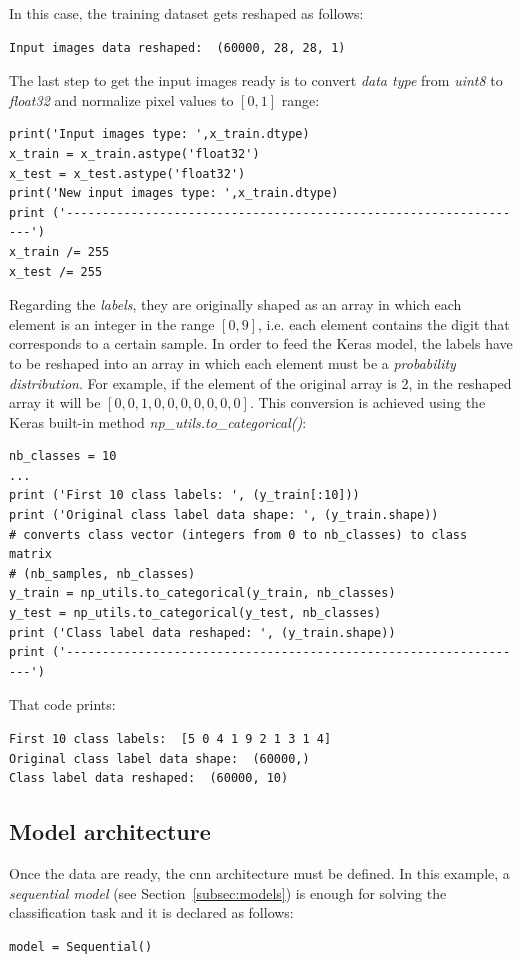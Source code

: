 In this case, the training dataset gets reshaped as follows:
\begin{Verbatim}[frame=single]
Input images data reshaped:  (60000, 28, 28, 1)
\end{Verbatim}

The last step to get the input images ready is to convert \emph{data type} from \textit{uint8} to \textit{float32} and normalize pixel values to $[0,1]$ range:
\begin{lstlisting}
print('Input images type: ',x_train.dtype)
x_train = x_train.astype('float32')
x_test = x_test.astype('float32')
print('New input images type: ',x_train.dtype)
print ('-----------------------------------------------------------------')
x_train /= 255
x_test /= 255
\end{lstlisting}

Regarding the \emph{labels}, they are originally shaped as an array in which each element is an integer in the range $[0, 9]$, i.e. each element contains the digit that corresponds to a certain sample. In order to feed the Keras model, the labels have to be reshaped into an array in which each element must be a \emph{probability distribution}. For example, if the element of the original array is 2, in the reshaped array it will be $[0, 0, 1, 0, 0, 0, 0, 0, 0, 0]$. This conversion is achieved using the Keras built-in method \emph{\textit{np\_utils.to\_categorical()}}:
\begin{lstlisting}
nb_classes = 10
...
print ('First 10 class labels: ', (y_train[:10]))
print ('Original class label data shape: ', (y_train.shape))
# converts class vector (integers from 0 to nb_classes) to class matrix
# (nb_samples, nb_classes)
y_train = np_utils.to_categorical(y_train, nb_classes)
y_test = np_utils.to_categorical(y_test, nb_classes)
print ('Class label data reshaped: ', (y_train.shape))
print ('-----------------------------------------------------------------')
\end{lstlisting}

That code prints:
\begin{Verbatim}[frame=single]
First 10 class labels:  [5 0 4 1 9 2 1 3 1 4]
Original class label data shape:  (60000,)
Class label data reshaped:  (60000, 10)
\end{Verbatim}

\subsection{Model architecture}
Once the data are ready, the \gls{cnn} architecture must be defined. In this example, a \emph{sequential model} (see Section~\ref{subsec:models}) is enough for solving the classification task and it is declared as follows:
\begin{lstlisting}
model = Sequential()
\end{lstlisting}

